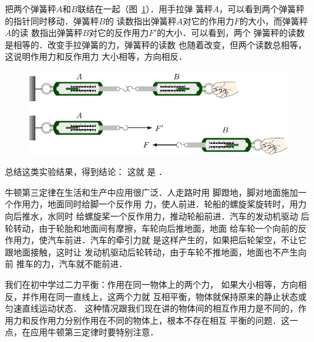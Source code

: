     把两个弹簧秤$A$和$B$联结在一起（图~\ref{fig_A_1-15}）．用手拉弹
簧秤$A$，可以看到两个弹簧秤的指针同时移动．弹簧秤$B$的
读数指出弹簧秤$A$对它的作用力$F$的大小，而弹簧秤$A$的读
数指出弹簧秤$B$对它的反作用力$F'$的大小．可以看到，两个
弹簧秤的读数是相等的．改变手拉弹簧的力，弹簧秤的读数
也随着改变，但两个读数总相等，这说明作用力和反作用力
大小相等，方向相反．
\begin{figure}[htbp]
	\centering
	\includegraphics{fig/A/1-15.pdf} 
	\caption{} \label{fig_A_1-15} 
\end{figure} 


    总结这类实验结果，得到结论： 这就
是 ．

牛顿第三定律在生活和生产中应用很广泛．人走路时用
脚蹬地，脚对地面施加一个作用力，地面同时给脚一个反作用
力，使人前进．轮船的螺旋桨旋转时，用力向后推水，水同时
给螺旋桨一个反作用力，推动轮船前进．汽车的发动机驱动
后轮转动，由于轮胎和地面间有摩擦，车轮向后推地面，地面
给车轮一个向前的反作用力，使汽车前进．汽车的牵引力就
是这样产生的，如果把后轮架空，不让它跟地面接触，这时让
发动机驱动后轮转动，由于车轮不推地面，地面也不产生向前
推车的力，汽车就不能前进．

    我们在初中学过二力平衡：作用在同一物体上的两个力，
如果大小相等，方向相反，并作用在同一直线上，这两个力就
互相平衡，物体就保持原来的静止状态或匀速直线运动状态．
这种情况跟我们现在讲的物体间的相互作用力是不同的，作
用力和反作用力分别作用在不同的物体上，根本不存在相互
平衡的问题．这一点，在应用牛顿第三定律时要特别注意．


